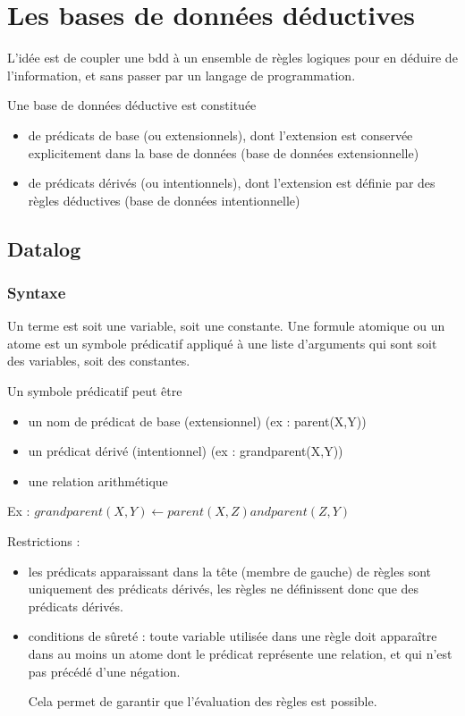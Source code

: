\chapter{Les bases de données déductives}

L'idée est de coupler une bdd à un ensemble de règles logiques pour en déduire de l'information, et sans passer par un langage de programmation.

Une base de données déductive est constituée

\begin{itemize}
	\item de prédicats de base (ou extensionnels), dont l'extension est conservée explicitement dans la base de données (base de données extensionnelle)
	\item de prédicats dérivés (ou intentionnels), dont l'extension est définie par des règles déductives (base de données intentionnelle)
\end{itemize}


	\section{Datalog}
	
		\subsection{Syntaxe}
		
		Un terme est soit une variable, soit une constante. Une formule atomique ou un atome est un symbole prédicatif appliqué à une liste d'arguments qui sont soit des variables, soit des constantes.
		
		Un symbole prédicatif peut être
		
		\begin{itemize}
			\item un nom de prédicat de base (extensionnel) (ex : parent(X,Y))
			\item un prédicat dérivé (intentionnel) (ex : grandparent(X,Y))
			\item une relation arithmétique
		\end{itemize}
		
		Ex : $grandparent(X,Y) \leftarrow parent(X,Z) and parent(Z, Y)$
		
		Restrictions :
		
		\begin{itemize}
			\item les prédicats apparaissant dans la tête (membre de gauche) de règles sont uniquement des prédicats dérivés, les règles ne définissent donc que des prédicats dérivés.
			\item conditions de sûreté : toute variable utilisée dans une règle doit apparaître dans au moins un atome dont le prédicat représente une relation, et qui n'est pas précédé d'une négation.
			
			Cela permet de garantir que l'évaluation des règles est possible.
		\end{itemize}
		
